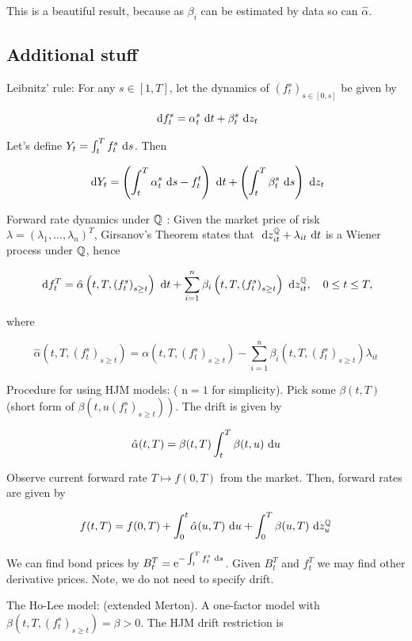 This is a beautiful result, because as $\beta_{i}$ can be estimated by data so can $\hat{\alpha}$.

\subsection{Additional stuff}
Leibnitz' rule: For any $s \in[1, T]$, let the dynamics of $\left(f_{t}^{s}\right)_{s \in[0, s]}$ be given by

$$
\text{ d}  f_{t}^{s}=\alpha_{t}^{s} \text{ d}  t+\beta_{t}^{s} \text{ d}  z_{t}
$$

Let's define $Y_{t}=\int_{t}^{T} f_{t}^{s} \text{ d}  s$. Then

$$
\text{ d}  Y_{t}=\left(\int_{t}^{T} \alpha_{t}^{s} \text{ d}  s-f_{t}^{t}\right) \text{ d}  t+\left(\int_{t}^{T} \beta_{t}^{s} \text{ d}  s\right) \text{ d}  z_{t}
$$

Forward rate dynamics under $\mathbb{Q}$ : Given the market price of risk $\lambda=\left(\lambda_{1}, \ldots, \lambda_{n}\right)^{T}$, Girsanov's Theorem states that $\text{ d}  z_{i t}^{\mathbb{Q}}+\lambda_{i t} \text{ d}  t$ is a Wiener process under $\mathbb{Q}$, hence

$$
\text{ d}  f_{t}^{T}=\hat{\alpha}\left(t, T,\left(f_{t}^{s}\right)_{s \geq t}\right) \text{ d}  t+\sum_{i=1}^{n} \beta_{i}\left(t, T,\left(f_{t}^{s}\right)_{s \geq t}\right) \text{ d}  z_{i t}^{\mathbb{Q}}, \quad 0 \leq t \leq T,
$$

where

$$
\hat{\alpha}\left(t, T,\left(f_{t}^{s}\right)_{s \geq t}\right)=\alpha\left(t, T,\left(f_{t}^{s}\right)_{s \geq t}\right)-\sum_{i=1}^{n} \beta_{i}\left(t, T,\left(f_{t}^{s}\right)_{s \geq t}\right) \lambda_{i t}
$$

Procedure for using HJM models: ( $\mathrm{n}=1$ for simplicity). Pick some $\beta(t, T)$ (short form of $\left.\beta\left(t, u\left(f_{t}^{s}\right)_{s \geq t}\right)\right)$. The drift is given by

$$
\hat{\alpha}(t, T)=\beta(t, T) \int_{t}^{T} \beta(t, u) \text{ d}  u
$$

Observe current forward rate $T \mapsto f(0, T)$ from the market. Then, forward rates are given by

$$
f(t, T)=f(0, T)+\int_{0}^{t} \hat{\alpha}(u, T) \text{ d}  u+\int_{0}^{T} \beta(u, T) \text{ d}  z_{u}^{\mathbb{Q}}
$$

We can find bond prices by $B_{t}^{T}=\mathrm{e}^{-\int_{t}^{T} f_{t}^{s} \text{ d}  s}$. Given $B_{t}^{T}$ and $f_{t}^{T}$ we may find other derivative prices. Note, we do not need to specify drift.

The Ho-Lee model: (extended Merton). A one-factor model with $\beta\left(t, T,\left(f_{t}^{s}\right)_{s \geq t}\right)= \beta>0$. The HJM drift restriction is

